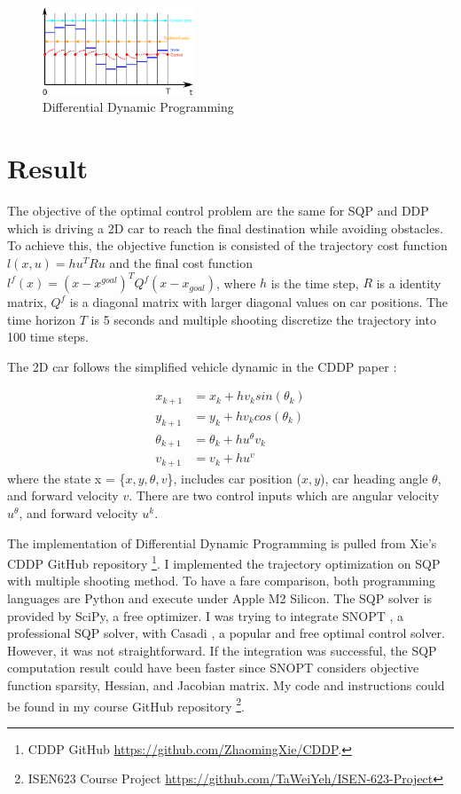 \documentclass{article}
\begin{document}
\begin{figure}[h!]
    \centering
    \includegraphics[width=0.4\textwidth]{images/xu_gap_ddp.png}
    \caption{Differential Dynamic Programming}
    \label{fig:ddp}
\end{figure}

\section{Result}

The objective of the optimal control problem are the same for SQP and DDP which is driving a 2D car to reach the final destination while avoiding obstacles. To achieve this, the objective function is consisted of the trajectory cost function $l(x,u) = hu^TRu$ and the final cost function $l^f(x) = (x - x^{goal})^TQ^f(x-x_{goal})$, where $h$ is the time step, $R$ is a identity matrix, $Q^f$ is a diagonal matrix with larger diagonal values on car positions. The time horizon $T$ is 5 seconds and multiple shooting discretize the trajectory into 100 time steps. 

The 2D car follows the simplified vehicle dynamic in the CDDP paper \cite{CDDP}:

\begin{align*}
    x_{k+1} &= x_k + h v_k sin(\theta_k) \\
    y_{k+1} &= y_k + h v_k cos(\theta_k) \\
    \theta_{k+1} &= \theta_k + h u^{\theta} v_k \\
    v_{k+1} &= v_k + h u^{v} 
\end{align*}
where the state x = \{$x, y, \theta, v$\}, includes car position ($x, y$), car heading angle $\theta$, and forward velocity $v$. There are two control inputs which are angular velocity $u^{\theta}$, and forward velocity $u^k$. 

The implementation of Differential Dynamic Programming is pulled from Xie's CDDP GitHub repository \footnote{CDDP GitHub \url{https://github.com/ZhaomingXie/CDDP}.}. I implemented the trajectory optimization on SQP with multiple shooting method. To have a fare comparison, both programming languages are Python and execute under Apple M2 Silicon. The SQP solver is provided by SciPy, a free optimizer. I was trying to integrate SNOPT \cite{gill2005snopt}, a professional SQP solver, with Casadi \cite{andersson2019casadi}, a popular and free optimal control solver. However, it was not straightforward. If the integration was successful, the SQP computation result could have been faster since SNOPT considers objective function sparsity, Hessian, and Jacobian matrix. My code and instructions could be found in my course GitHub repository \footnote{ISEN623 Course Project \url{https://github.com/TaWeiYeh/ISEN-623-Project}}. 
\end{document}
